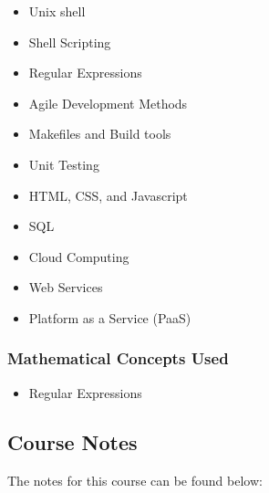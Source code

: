 {\begin{highlight}[\CSPBSoftDev]
        \begin{itemize}
            \item Unix shell
            \item Shell Scripting
            \item Regular Expressions
            \item Agile Development Methods
            \item Makefiles and Build tools
            \item Unit Testing
            \item HTML, CSS, and Javascript
            \item SQL
            \item Cloud Computing
            \item Web Services
            \item Platform as a Service (PaaS)
        \end{itemize}
        
        \subsubsection*{Mathematical Concepts Used}
    
        \begin{itemize}
            \item Regular Expressions
        \end{itemize}
    \end{highlight}
}

\subsection{Course Notes}

The notes for this course can be found below:




